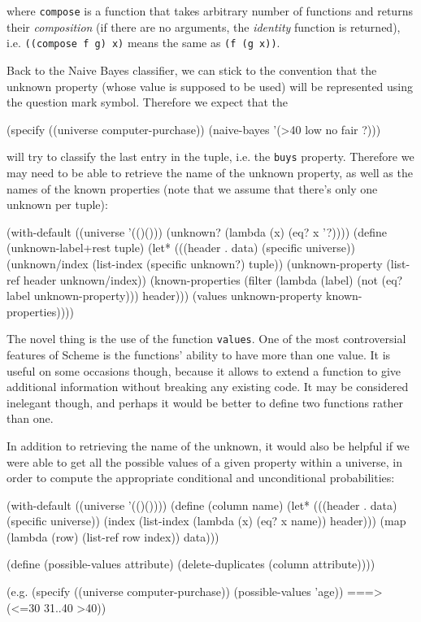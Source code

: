 where \texttt{compose} is a function that takes arbitrary
number of functions and returns their \textit{composition}
(if there are no arguments, the \textit{identity} function
is returned), i.e. \texttt{((compose f g) x)} means the
same as \texttt{(f (g x))}.

Back to the Naive Bayes classifier, we can stick to
the convention that the unknown property (whose value
is supposed to be used) will be represented using the
question mark symbol. Therefore we expect that the

\begin{Snippet}
(specify ((universe computer-purchase))
  (naive-bayes '(>40 low no fair ?)))
\end{Snippet}

will try to classify the last entry in the tuple, i.e.
the \texttt{buys} property. Therefore we may need to be able
to retrieve the name of the unknown property, as well
as the names of the known properties (note that we assume
that there's only one unknown per tuple):

\begin{Snippet}
(with-default ((universe '(()()))
               (unknown? (lambda (x) (eq? x '?))))
  (define (unknown-label+rest tuple)
    (let* (((header . data) (specific universe))
	   (unknown/index (list-index (specific unknown?) tuple))
	   (unknown-property (list-ref header unknown/index))
           (known-properties (filter (lambda (label)
                                       (not (eq? label
                                                 unknown-property)))
				     header)))
      (values unknown-property known-properties))))
\end{Snippet}

The novel thing is the use of the function \texttt{values}.
One of the most controversial features of Scheme is the functions'
ability to have more than one value. It is useful on some
occasions though, because it allows to extend a function
to give additional information without breaking any existing
code. It may be considered inelegant though, and perhaps
it would be better to define two functions rather than one.


In addition to retrieving the name of the unknown, it would 
also be helpful if we were able to get all the possible values
of a given property within a universe, in order to compute
the appropriate conditional and unconditional probabilities:

\begin{Snippet}
(with-default ((universe '(()())))
  (define (column name)
    (let* (((header . data) (specific universe))
	   (index (list-index (lambda (x) (eq? x name)) header)))
      (map (lambda (row)
	     (list-ref row index))
	   data)))

  (define (possible-values attribute)
    (delete-duplicates (column attribute))))
\end{Snippet}
\begin{Snippet}
(e.g.
 (specify ((universe computer-purchase))
   (possible-values 'age)) ===> (<=30 31..40 >40))
\end{Snippet}

